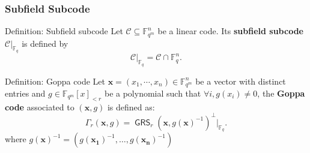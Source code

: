 \documentclass[
10pt, %
%
aspectratio=169, %
]{beamer}
\theoremstyle{plain}%
\theoremstyle{definition}
\theoremstyle{remark}
\newcommand{\calC}{\mathcal{C}}
\newcommand{\fqm}{\mathbb{F}_{q^m}}
\newcommand{\fq}{\mathbb{F}_{q}}
\newcommand{\GRS}{\operatorname{\mathsf{GRS}}}
\begin{document}
\begin{frame}
	\frametitle{Subfield Subcode}
	\begin{block}{Definition: Subfield subcode}
		Let $\calC\subseteq \fqm^n$ be a linear code.
		Its \textbf{subfield subcode} $\calC|_{\fq}$ is defined by 
		\[\calC|_{\fq}=\calC \cap \mathbb{F}_q^n.\]
	\end{block}
\begin{block}{Definition: Goppa code}
	Let $\mathbf{x}=(x_1,\cdots,x_n) \in \fqm^n$ be a vector with distinct entries and $g \in \fqm [x]_{<r}$ be a polynomial such that $\forall i, g(x_i)\neq 0$, the \textbf{Goppa code} associated to $(\mathbf{x}, g)$ is defined as: \[\Gamma_r(\mathbf{x},g)= \GRS_r(\mathbf{x},g(\mathbf{x})^{-1})^\perp|_{\fq}.\]
	where $g(\mathbf{x})^{-1}=(g(\mathbf{x_1})^{-1},\dots,g(\mathbf{x_n})^{-1})$
\end{block}
\end{frame}
\end{document}
